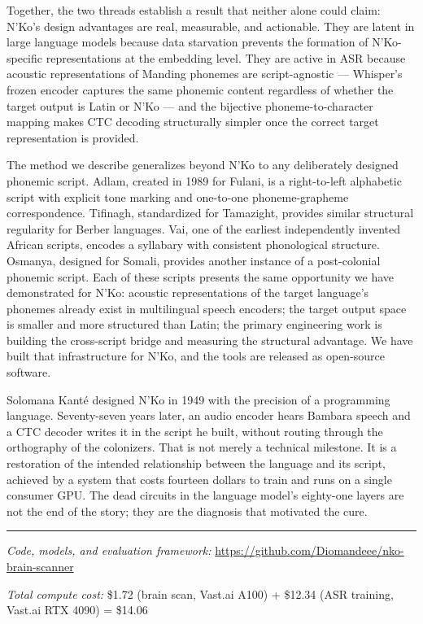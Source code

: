 \documentclass[11pt]{article}
\newcommand{\nko}{N'Ko}
\begin{document}
Together, the two threads establish a result that neither alone could claim: \nko{}'s design advantages are real, measurable, and actionable. They are latent in large language models because data starvation prevents the formation of \nko{}-specific representations at the embedding level. They are active in ASR because acoustic representations of Manding phonemes are script-agnostic --- Whisper's frozen encoder captures the same phonemic content regardless of whether the target output is Latin or \nko{} --- and the bijective phoneme-to-character mapping makes CTC decoding structurally simpler once the correct target representation is provided.

The method we describe generalizes beyond \nko{} to any deliberately designed phonemic script. Adlam, created in 1989 for Fulani, is a right-to-left alphabetic script with explicit tone marking and one-to-one phoneme-grapheme correspondence. Tifinagh, standardized for Tamazight, provides similar structural regularity for Berber languages. Vai, one of the earliest independently invented African scripts, encodes a syllabary with consistent phonological structure. Osmanya, designed for Somali, provides another instance of a post-colonial phonemic script. Each of these scripts presents the same opportunity we have demonstrated for \nko{}: acoustic representations of the target language's phonemes already exist in multilingual speech encoders; the target output space is smaller and more structured than Latin; the primary engineering work is building the cross-script bridge and measuring the structural advantage. We have built that infrastructure for \nko{}, and the tools are released as open-source software.

Solomana Kant\'e designed \nko{} in 1949 with the precision of a programming language. Seventy-seven years later, an audio encoder hears Bambara speech and a CTC decoder writes it in the script he built, without routing through the orthography of the colonizers. That is not merely a technical milestone. It is a restoration of the intended relationship between the language and its script, achieved by a system that costs fourteen dollars to train and runs on a single consumer GPU. The dead circuits in the language model's eighty-one layers are not the end of the story; they are the diagnosis that motivated the cure.


\vspace{1em}
\noindent\rule{\columnwidth}{0.4pt}

\vspace{0.5em}
\noindent\small\textit{Code, models, and evaluation framework:} \url{https://github.com/Diomandeee/nko-brain-scanner}

\noindent\small\textit{Total compute cost:} \$1.72 (brain scan, Vast.ai A100) + \$12.34 (ASR training, Vast.ai RTX 4090) = \$14.06



\end{document}
